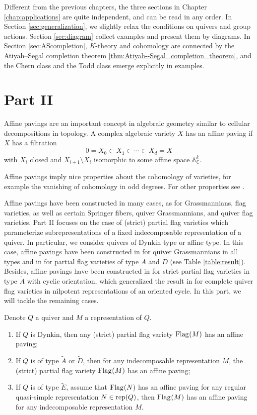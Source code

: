 Different from the previous chapters, the three sections in Chapter \ref{chap:applications} are quite independent, and can be read in any order. In Section \ref{sec:generalization}, we slightly relax the conditions on quivers and group actions. Section \ref{sec:diagram} collect examples and present them by diagrams. In Section \ref{sec:AScompletion}, $K$-theory and cohomology are connected by the Atiyah--Segal completion theorem \ref{thm:Atiyah--Segal_completion_theorem}, and the Chern class and the Todd class emerge explicitly in examples.

\section*{Part II}

Affine pavings are an important concept in algebraic geometry similar to cellular decompositions in topology. A complex algebraic variety $X$ has an affine paving if $X$ has a filtration
$$0= X_0 \subset X_1 \subset \cdots \subset X_d=X$$
with $X_i$ closed and $X_{i+1} \setminus X_i$ isomorphic to some affine space $\mathbb{A}^k_{\mathbb{C}}$.

Affine pavings imply nice properties about the cohomology of varieties, for example the vanishing of cohomology in odd degrees. For other properties see \cite[1.7]{de1988homology}.

Affine pavings have been constructed in many cases, as for Grassmannians, flag varieties, as well as certain Springer fibers, quiver Grassmannians, and quiver flag varieties. Part II focuses on the case of (strict) partial flag varieties which parameterize subrepresentations of a fixed indecomposable representation of a quiver. In particular, we consider quivers of Dynkin type or affine type.
In this case, affine pavings have been constructed in \cite{irelli2019cell} for quiver Grassmannians in all types and in \cite{maksimau2019flag} for partial flag varieties of type $A$ and $D$ (see Table \ref{table:result}). Besides, affine pavings 
have been constructed in \cite[Theorem 6.3]{eberhardt2022motivic} for strict partial flag varieties in type $\tilde{A}$ with cyclic orientation, which generalized the result in \cite{sauter2015cell} for complete quiver flag varieties in nilpotent representations of an oriented cycle. In this part, we will tackle the remaining cases.
\begin{theorem}\label{thm:affine_paving}
Denote $Q$ a quiver and $M$ a representation of $Q$.
\begin{enumerate}[(1)]
\item If $Q$ is Dynkin, then any (strict) partial flag variety $\operatorname{Flag}_{}(M)$ has an affine paving;
\item If $Q$ is of type $\tilde{A}$ or $\tilde{D}$, then for any indecomposable representation $M$, the (strict) partial flag variety $\operatorname{Flag}_{}(M)$ has an affine paving;
\item If $Q$ is of type $\tilde{E}$, assume that $\operatorname{Flag}_{}(N)$ has an affine paving for any regular quasi-simple representation $N \in \operatorname{\operatorname{rep}}(Q)$, then $\operatorname{Flag}_{}(M)$ has an affine paving for any indecomposable representation $M$.
\end{enumerate}
\end{theorem}

